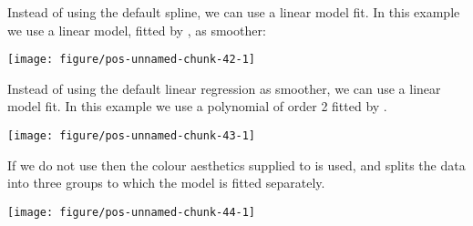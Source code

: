 \documentclass[paper=a4,headsepline,BCOR=12mm,twoside,open=right,%
titlepage,headings=small,fontsize=10pt,index=totoc,bibliography=totoc,%
captions=tableheading,captions=nooneline]{scrbook}\usepackage{knitr}
\begin{document}
Instead of using the default spline, we can use a linear model fit. In this example we use a linear model, fitted by , as smoother:

\begin{knitrout}\footnotesize
{}\color{fgcolor}\begin{kframe}
\begin{alltt}
 \hlopt{+} \hlstd{(}\hlstd{=}\hlstd{,} \hlstd{=}\hlstd{)}
\end{alltt}
\end{kframe}

{\centering \texttt{[image: figure/pos-unnamed-chunk-42-1]} 

}



\end{knitrout}

Instead of using the default linear regression as smoother, we can use a linear model fit. In this example we use a polynomial of order 2 fitted by .

\begin{knitrout}\footnotesize
{}\color{fgcolor}\begin{kframe}
\begin{alltt}
 \hlopt{+} \hlstd{(}\hlstd{=}\hlstd{,} \hlopt{~}\hlstd{),} \hlstd{=}\hlstd{)}
\end{alltt}
\end{kframe}

{\centering \texttt{[image: figure/pos-unnamed-chunk-43-1]} 

}



\end{knitrout}

If we do not use  then the colour aesthetics supplied to  is used, and splits the data into three groups to which the model is fitted separately.

\begin{knitrout}\footnotesize
{}\color{fgcolor}\begin{kframe}
\begin{alltt}
 \hlopt{+} \hlstd{(}\hlstd{=}\hlstd{)}
\end{alltt}
\end{kframe}

{\centering \texttt{[image: figure/pos-unnamed-chunk-44-1]} 

}



\end{knitrout}
\end{document}
